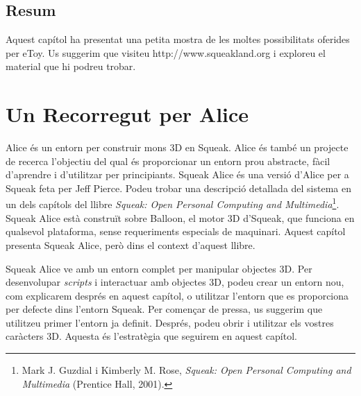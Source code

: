 \section{Resum}

Aquest capítol ha presentat una petita mostra de les moltes possibilitats oferides per eToy. Us suggerim que visiteu \textsf{http://www.squeakland.org} i exploreu el material que hi podreu trobar.

\chapter{Un Recorregut per Alice}
\label{cap25}
Alice és un entorn per construir mons 3D en Squeak. Alice és també un projecte de recerca l'objectiu del qual és proporcionar un entorn prou abstracte, fàcil d'aprendre i d'utilitzar per principiants. Squeak Alice és una versió d'Alice per a Squeak feta per Jeff Pierce. Podeu trobar una descripció detallada del sistema en un dels capítols del llibre \emph{Squeak: Open Personal Computing and Multimedia}\footnote{Mark J. Guzdial i Kimberly M. Rose, \emph{Squeak: Open Personal Computing and Multimedia} (Prentice Hall, 2001).}. Squeak Alice està construït sobre \textsf{Balloon}, el motor 3D d'Squeak, que funciona en qualsevol plataforma, sense requeriments especials de maquinari. Aquest capítol presenta Squeak Alice, però dins el context d'aquest llibre.

Squeak Alice ve amb un entorn complet per manipular objectes 3D. Per desenvolupar \emph{scripts} i interactuar amb objectes 3D, podeu crear un entorn nou, com explicarem després en aquest capítol, o utilitzar l'entorn que es proporciona per defecte dins l'entorn Squeak. Per començar de pressa, us suggerim que utilitzeu primer l'entorn ja definit. Després, podeu obrir i utilitzar els vostres caràcters 3D. Aquesta és l'estratègia que seguirem en aquest capítol.


